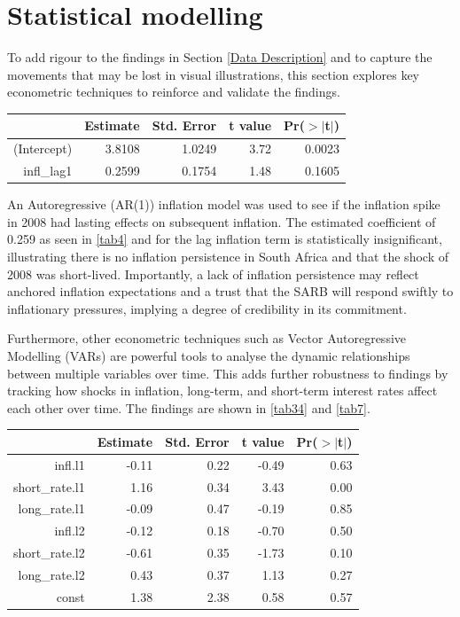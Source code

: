 \documentclass[11pt,preprint]{elsarticle}
\let\origtable\table
\let\endorigtable\endtable
\renewenvironment{table}[1][2] {
    \expandafter\origtable\expandafter[H]
} {
    \endorigtable
}
\numberwithin{equation}{section}
\numberwithin{figure}{section}
\numberwithin{table}{section}
\begin{document}
\section{\texorpdfstring{Statistical
modelling\label{Statistical modelling}}{Statistical modelling}}\label{statistical-modelling}

To add rigour to the findings in Section \ref{Data Description} and to
capture the movements that may be lost in visual illustrations, this
section explores key econometric techniques to reinforce and validate
the findings.

\begin{table}[H]
\centering
\begin{tabular}{rrrrr}
  \hline
 & Estimate & Std. Error & t value & Pr($>$$|$t$|$) \\ 
  \hline
(Intercept) & 3.8108 & 1.0249 & 3.72 & 0.0023 \\ 
  infl\_lag1 & 0.2599 & 0.1754 & 1.48 & 0.1605 \\ 
   \hline
\end{tabular}
\caption{Inflation Persistence in South Africa (2008-2024) \label{tab4}} 
\end{table}

An Autoregressive (AR(1)) inflation model was used to see if the
inflation spike in 2008 had lasting effects on subsequent inflation. The
estimated coefficient of 0.259 as seen in \ref{tab4} and for the lag
inflation term is statistically insignificant, illustrating there is no
inflation persistence in South Africa and that the shock of 2008 was
short-lived. Importantly, a lack of inflation persistence may reflect
anchored inflation expectations and a trust that the SARB will respond
swiftly to inflationary pressures, implying a degree of credibility in
its commitment.

Furthermore, other econometric techniques such as Vector Autoregressive
Modelling (VARs) are powerful tools to analyse the dynamic relationships
between multiple variables over time. This adds further robustness to
findings by tracking how shocks in inflation, long-term, and short-term
interest rates affect each other over time. The findings are shown in
\ref{tab34} and \ref{tab7}.

\begin{table}[ht]
\centering
\begin{tabular}{rrrrr}
  \hline
 & Estimate & Std. Error & t value & Pr($>$$|$t$|$) \\ 
  \hline
infl.l1 & -0.11 & 0.22 & -0.49 & 0.63 \\ 
  short\_rate.l1 & 1.16 & 0.34 & 3.43 & 0.00 \\ 
  long\_rate.l1 & -0.09 & 0.47 & -0.19 & 0.85 \\ 
  infl.l2 & -0.12 & 0.18 & -0.70 & 0.50 \\ 
  short\_rate.l2 & -0.61 & 0.35 & -1.73 & 0.10 \\ 
  long\_rate.l2 & 0.43 & 0.37 & 1.13 & 0.27 \\ 
  const & 1.38 & 2.38 & 0.58 & 0.57 \\ 
   \hline
\end{tabular}
\caption{VAR Equation for Short-Term Interest Rate \label{tab34}} 
\end{table}
\end{document}
